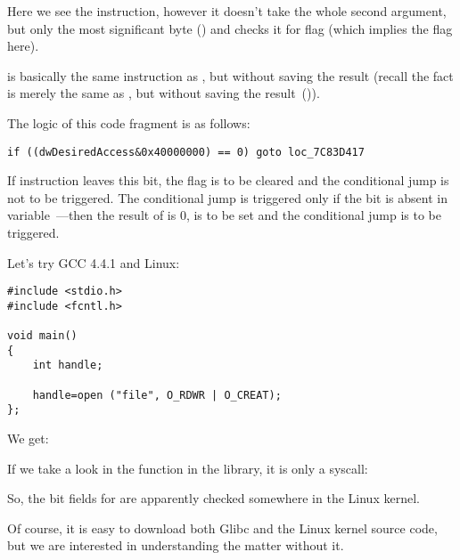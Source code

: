 Here we see the \TEST instruction, however it doesn't take the whole second argument,\\
but only the most significant byte () and checks it for flag 
(which implies the  flag here).

\TEST is basically the same instruction as \AND, but without saving the result
(recall the fact \CMP is merely the same as \SUB, but without saving the result~()).

The logic of this code fragment is as follows:

\begin{lstlisting}[style=customc]
if ((dwDesiredAccess&0x40000000) == 0) goto loc_7C83D417
\end{lstlisting}


If \AND instruction leaves this bit, the \ZF flag is to be cleared and the 
\JZ conditional jump is not to be triggered.
The conditional jump is triggered only if the  bit is absent in  variable~---then the result of \AND is 0,
\ZF is to be set and the conditional jump is to be triggered.

Let's try GCC 4.4.1 and Linux:

\begin{lstlisting}[style=customc]
#include <stdio.h>
#include <fcntl.h>

void main()
{
	int handle;

	handle=open ("file", O_RDWR | O_CREAT);
};
\end{lstlisting}

We get:




If we take a look in the  function in the  library, it is only a syscall:



So, the bit fields for  are apparently checked somewhere in the Linux kernel.

Of course, it is easy to download both Glibc and the Linux kernel source code, 
but we are interested in understanding the matter without it.


